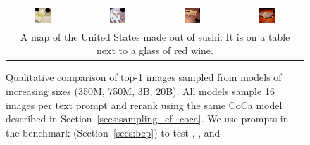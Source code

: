 \begin{figure}[ht!]
\begin{tabular}{cccc}
        \includegraphics[width=0.24\textwidth]{figures/scaling_comparison/map_0.jpg} &
        \includegraphics[width=0.24\textwidth]{figures/scaling_comparison/map_1.jpg} &
        \includegraphics[width=0.24\textwidth]{figures/scaling_comparison/map_2.jpg} &
        \includegraphics[width=0.24\textwidth]{figures/scaling_comparison/map_3.jpg}\vspace{1mm} \\
        \multicolumn{4}{c}{\small A map of the United States made out of sushi. It is on a table next to a glass of red wine.} \\
    \end{tabular} 
    \caption{Qualitative comparison of top-1 images sampled from \bdraw models of increasing sizes (350M, 750M, 3B, 20B). All \bdraw models sample 16 images per text prompt and rerank using the same CoCa model described in Section~\ref{secs:sampling_cf_coca}. We use prompts in the \bcpa{} benchmark (Section~\ref{secs:bcp}) to test , , and 
    }
    \label{figs:scaling_comparison}
    \vspace{-0.15in}
\end{figure}
